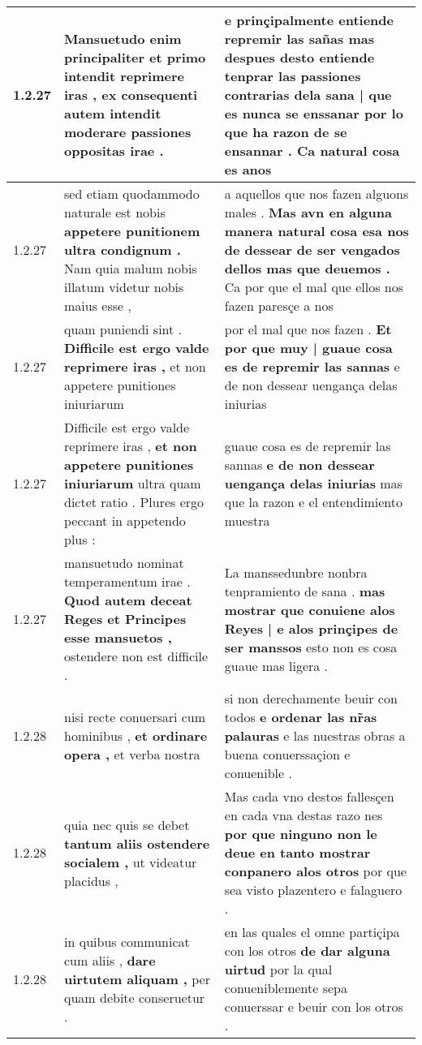 \begin{tabular}{|p{1cm}|p{6.5cm}|p{6.5cm}|}
1.2.27 & Mansuetudo enim principaliter \textbf{ et primo intendit reprimere iras , } ex consequenti autem intendit moderare passiones oppositas irae . & e prinçipalmente entiende repremir las sañas \textbf{ mas despues desto entiende tenprar las passiones contrarias dela sana | que es nunca se enssanar } por lo que ha razon de se ensannar . Ca natural cosa es anos \\\hline
1.2.27 & sed etiam quodammodo naturale est nobis \textbf{ appetere punitionem ultra condignum . } Nam quia malum nobis illatum videtur nobis maius esse , & a aquellos que nos fazen alguons males . \textbf{ Mas avn en alguna manera natural cosa esa nos de dessear de ser vengados dellos mas que deuemos . } Ca por que el mal que ellos nos fazen paresçe a nos \\\hline
1.2.27 & quam puniendi sint . \textbf{ Difficile est ergo valde reprimere iras , } et non appetere punitiones iniuriarum & por el mal que nos fazen . \textbf{ Et por que muy | guaue cosa es de repremir las sannas } e de non dessear uengança delas iniurias \\\hline
1.2.27 & Difficile est ergo valde reprimere iras , \textbf{ et non appetere punitiones iniuriarum } ultra quam dictet ratio . Plures ergo peccant in appetendo plus : & guaue cosa es de repremir las sannas \textbf{ e de non dessear uengança delas iniurias } mas que la razon e el entendimiento muestra \\\hline
1.2.27 & mansuetudo nominat temperamentum irae . \textbf{ Quod autem deceat Reges et Principes esse mansuetos , } ostendere non est difficile . & La manssedunbre nonbra tenpramiento de sana . \textbf{ mas mostrar que conuiene alos Reyes | e alos prinçipes de ser manssos } esto non es cosa guaue mas ligera . \\\hline
1.2.28 & nisi recte conuersari cum hominibus , \textbf{ et ordinare opera , } et verba nostra & si non derechamente beuir con todos \textbf{ e ordenar las nr̃as palauras } e las nuestras obras a buena conuerssaçion e conuenible . \\\hline
1.2.28 & quia nec quis se debet \textbf{ tantum aliis ostendere socialem , } ut videatur placidus , & Mas cada vno destos fallesçen en cada vna destas razo nes \textbf{ por que ninguno non le deue en tanto mostrar conpanero alos otros } por que sea visto plazentero e falaguero . \\\hline
1.2.28 & in quibus communicat cum aliis , \textbf{ dare uirtutem aliquam , } per quam debite conseruetur . & en las quales el omne partiçipa con los otros \textbf{ de dar alguna uirtud } por la qual conueniblemente sepa conuerssar e beuir con los otros . \\\hline

\end{tabular}
